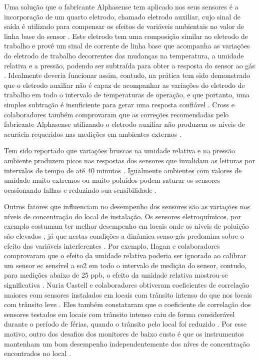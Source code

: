 Uma solução que o fabricante Alphasense tem aplicado nos seus sensores é a incorporação de um quarto eletrodo, chamado eletrodo auxiliar, cujo sinal de saída é utilizado para compensar os efeitos de variáveis ambientais no valor de linha base do sensor \cite{Alphasense2019AlphasenseSensors}. Este eletrodo tem uma composição similar ao eletrodo de trabalho e provê um sinal de corrente de linha base que acompanha as variações do eletrodo de trabalho decorrentes das mudanças na temperatura, a umidade relativa e a pressão, podendo ser subtraída para obter a resposta do sensor ao gás \cite{Baron2017AmperometricReview}. Idealmente deveria funcionar assim, contudo, na prática tem sido demonstrado que o eletrodo auxiliar não é capaz de acompanhar as variações do eletrodo de trabalho em todo o intervalo de temperaturas de operação, e que portanto, uma simples subtração é insuficiente para gerar uma resposta confiável \cite{Wei2018ImpactMonitoring}. Cross e colaboradores também comprovaram que as correções recomendadas pelo fabricante Alphasense utilizando o eletrodo auxiliar não produzem os níveis de acurácia requeridos nas medições em ambientes externos \cite{Cross2017UseMeasurements}.
	
Tem sido reportado que variações bruscas na umidade relativa e na pressão ambiente produzem picos nas respostas dos sensores que invalidam as leituras por intervalos de tempo de até 40 minutos \cite{Alphasense2013AlphasenseHUMIDITY,Lewis2018Low-costApplications}. Igualmente ambientes com valores de umidade muito extremos ou muito poluídos podem saturar os sensores ocasionando falhas e reduzindo sua sensibilidade \cite{Alphasense2013AlphasenseHUMIDITY}.

Outros fatores que influenciam no desempenho dos sensores são as variações nos níveis de concentração do local de instalação. Os sensores eletroquímicos, por exemplo costumam ter melhor desempenho em locais onde os níveis de poluição são elevados \cite{Castell2017CanEstimates}, já que nestas condições a dinâmica senso-gás predomina sobre o efeito das variáveis interferentes \cite{Hagan2018CalibrationInstruments}. Por exemplo, Hagan e colaboradores comprovaram que o efeito da umidade relativa poderia ser ignorado ao calibrar um sensor \gls{ec} sensível a \acrshort{so2} em todo o intervalo de medição do sensor, contudo, para medições abaixo de 25 ppb, o efeito da umidade relativa mostrou-se significativa \cite{Hagan2018CalibrationInstruments}. Nuria Castell e colaboradores obtiveram coeficientes de correlação maiores com sensores instalados em locais com trânsito intenso do que nos locais com trânsito leve \cite{Castell2017CanEstimates}. Eles também constataram que o coeficiente de correlação dos sensores testados em locais com trânsito intenso caiu de forma considerável durante o período de férias, quando o trânsito pelo local foi reduzido \cite{Castell2017CanEstimates}. Por esse motivo, outro dos desafios dos monitores de baixo custo é que os instrumentos mantenham um bom desempenho independentemente dos níves de concentração encontrados no local \cite{Concas2019ACalibration}.

